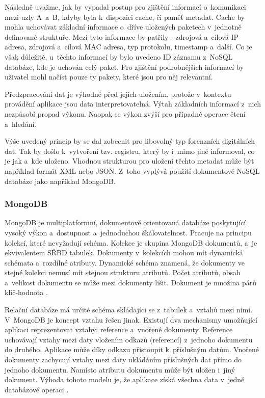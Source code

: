 Následně uvažme, jak by vypadal postup pro zjištění informací o~komunikaci mezi uzly A~a~B, kdyby byla k~dispozici cache, či paměť metadat. Cache by mohla uchovávat základní informace o~dříve uložených paketech v~jednotně definované struktuře. Mezi tyto informace by patřily - zdrojová a~cílová IP adresa, zdrojová a~cílová MAC adresa, typ protokolu, timestamp a~další. Co je však důležité, u~těchto informací by bylo uvedeno ID záznamu z~NoSQL databáze, kde je uchován celý paket. Pro zjištění podrobnějších informací by uživatel mohl načíst pouze ty pakety, které jsou pro něj relevantní.

Předzpracování dat je výhodné před jejich uložením, protože v~kontextu provádění aplikace jsou data interpretovatelná. Výtah základních informací z~nich nezpůsobí propad výkonu. Naopak se výkon zvýší pro případné operace čtení a~hledání.

Výše uvedený princip by se dal zobecnit pro libovolný typ forenzních digitálních dat. Tak by došlo k~vytvoření tzv. registru, který by i~mimo jiné informoval, co je jak a~kde uloženo. Vhodnou strukturou pro uložení těchto metadat může být například formát XML nebo JSON. Z~toho vyplývá použití dokumentové NoSQL databáze jako například MongoDB.

\subsubsection{MongoDB}
MongoDB je multiplatformní, dokumentově orientovaná databáze poskytující vysoký výkon a~dostupnost a~jednoduchou škálovatelnost. Pracuje na principu kolekcí, které nevyžadují schéma. Kolekce je skupina MongoDB dokumentů, a~je ekvivalentem SŘBD tabulek. Dokumenty v~kolekcích mohou mít dynamická schémata a~rozdílné atributy. Dynamické schéma znamená, že dokumenty ve stejné kolekci nemusí mít stejnou strukturu atributů. Počet atributů, obsah a~velikost dokumentu se může mezi dokumenty lišit. Dokument je množina párů klíč-hodnota \cite{mongoDBTutorialsPoint}.

Relační databáze má určité schéma skládající se z~tabulek a~vztahů mezi nimi. V~MongoDB je koncept vztahu řešen jinak. Existují dva mechanismy umožňující aplikaci reprezentovat vztahy: reference a~vnořené dokumenty. Reference uchovávají vztahy mezi daty vložením odkazů (referencí) z~jednoho dokumentu do druhého. Aplikace může díky odkazu přistoupit k~příslušným datům. Vnořené dokumenty zachycují vztahy mezi daty ukládáním příslušných dat přímo do jednoho dokumentu. Namísto atributu dokumentu může být uložen i~jiný dokument. Výhoda tohoto modelu je, že aplikace získá všechna data v~jedné databázové operaci \cite{mongoDBDataModelingIntro}.

